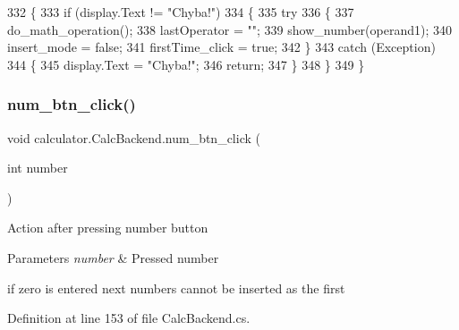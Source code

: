 \begin{DoxyCode}
332         \{
333             \textcolor{keywordflow}{if} (display.Text != \textcolor{stringliteral}{"Chyba!"})
334             \{
335                 \textcolor{keywordflow}{try}
336                 \{
337                     do\_math\_operation();
338                     lastOperator = \textcolor{stringliteral}{""};
339                     show\_number(operand1);
340                     insert\_mode = \textcolor{keyword}{false};
341                     firstTime\_click = \textcolor{keyword}{true};
342                 \}
343                 \textcolor{keywordflow}{catch} (Exception)
344                 \{
345                     display.Text = \textcolor{stringliteral}{"Chyba!"};
346                     \textcolor{keywordflow}{return};
347                 \}
348             \}
349         \}
\end{DoxyCode}
\mbox{\label{classcalculator_1_1_calc_backend_ada719e048ff0d7c532a63968c73edd2e}} 
\subsubsection{num\+\_\+btn\+\_\+click()}
{\footnotesize\ttfamily void calculator.\+Calc\+Backend.\+num\+\_\+btn\+\_\+click (\begin{DoxyParamCaption}\item[{int}]{number }\end{DoxyParamCaption})}



Action after pressing number button 


\begin{DoxyParams}{Parameters}
{\em number} & Pressed number\\
\hline
\end{DoxyParams}
if zero is entered next numbers cannot be inserted as the first

Definition at line 153 of file Calc\+Backend.\+cs.


